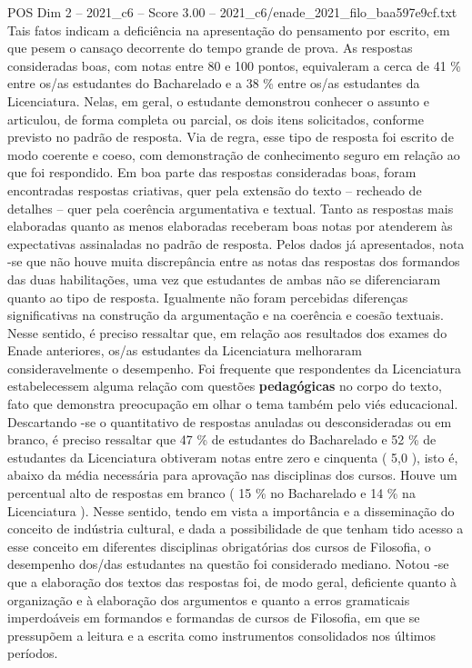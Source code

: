 \begin{textsample}{POS Dim 2 – 2021\_c6 – Score 3.00 – 2021\_c6/enade\_2021\_filo\_baa597e9cf.txt}
Tais fatos indicam a deficiência na apresentação do pensamento por escrito, em que pesem o cansaço decorrente do tempo grande de prova.
As respostas consideradas boas, com notas entre 80 e 100 pontos, equivaleram a cerca de 41 \% entre os/as estudantes do Bacharelado e a 38 \% entre os/as estudantes da Licenciatura.
Nelas, em geral, o estudante demonstrou conhecer o assunto e articulou, de forma completa ou parcial, os dois itens solicitados, conforme previsto no padrão de resposta.
Via de regra, esse tipo de resposta foi escrito de modo coerente e coeso, com demonstração de conhecimento seguro em relação ao que foi respondido.
Em boa parte das respostas consideradas boas, foram encontradas respostas criativas, quer pela extensão do texto – recheado de detalhes – quer pela coerência argumentativa e textual.
Tanto as respostas mais elaboradas quanto as menos elaboradas receberam boas notas por atenderem às expectativas assinaladas no padrão de resposta.
Pelos dados já apresentados, nota -se que não houve muita discrepância entre as notas das respostas dos formandos das duas habilitações, uma vez que estudantes de ambas não se diferenciaram quanto ao tipo de resposta.
Igualmente não foram percebidas diferenças significativas na construção da argumentação e na coerência e coesão textuais.
Nesse sentido, é preciso ressaltar que, em relação aos resultados dos exames do Enade anteriores, os/as estudantes da Licenciatura melhoraram consideravelmente o desempenho.
Foi frequente que respondentes da Licenciatura estabelecessem alguma relação com questões \textbf{pedagógicas} no corpo do texto, fato que demonstra preocupação em olhar o tema também pelo viés educacional.
Descartando -se o quantitativo de respostas anuladas ou desconsideradas ou em branco, é preciso ressaltar que 47 \% de estudantes do Bacharelado e 52 \% de estudantes da Licenciatura obtiveram notas entre zero e cinquenta ( 5,0 ), isto é, abaixo da média necessária para aprovação nas disciplinas dos cursos.
Houve um percentual alto de respostas em branco ( 15 \% no Bacharelado e 14 \% na Licenciatura ).
Nesse sentido, tendo em vista a importância e a disseminação do conceito de indústria cultural, e dada a possibilidade de que tenham tido acesso a esse conceito em diferentes disciplinas obrigatórias dos cursos de Filosofia, o desempenho dos/das estudantes na questão foi considerado mediano.
Notou -se que a elaboração dos textos das respostas foi, de modo geral, deficiente quanto à organização e à elaboração dos argumentos e quanto a erros gramaticais imperdoáveis em formandos e formandas de cursos de Filosofia, em que se pressupõem a leitura e a escrita como instrumentos consolidados nos últimos períodos.

\end{textsample}
